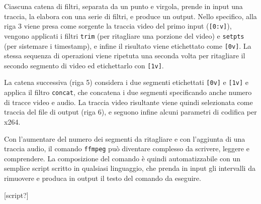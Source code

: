 Ciascuna catena di filtri, separata da un punto e virgola, prende in input una traccia, la elabora con una serie di filtri, e produce un output. Nello specifico, alla riga 3 viene presa come sorgente la traccia video del primo input (\texttt{[0:v]}), vengono applicati i filtri \texttt{trim} (per ritagliare una porzione del video) e \texttt{setpts} (per sistemare i timestamp\footnotemark{}), e infine il risultato viene etichettato come \texttt{[0v]}. La stessa sequenza di operazioni viene ripetuta una seconda volta per ritagliare il secondo segmento di video ed etichettarlo con \texttt{[1v]}.

La catena successiva (riga 5) considera i due segmenti etichettati \texttt{[0v]} e \texttt{[1v]} e applica il filtro \texttt{concat}, che concatena i due segmenti specificando anche numero di tracce video e audio. La traccia video risultante viene quindi selezionata come traccia del file di output (riga 6), e seguono infine alcuni parametri di codifica per x264.\cite{ozer}



Con l'aumentare del numero dei segmenti da ritagliare e con l'aggiunta di una traccia audio, il comando \texttt{ffmpeg} può diventare complesso da scrivere, leggere e comprendere. La composizione del comando è quindi automatizzabile con un semplice script scritto in qualsiasi linguaggio, che prenda in input gli intervalli da rimuovere e produca in output il testo del comando da eseguire.

[script?]

